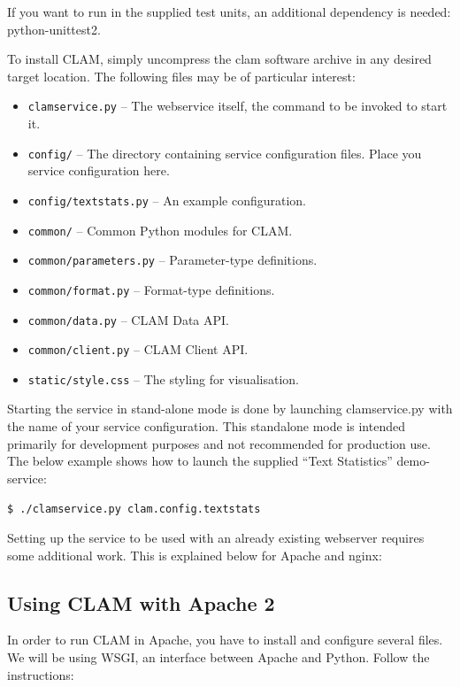 \documentclass[a4paper,12pt]{report}
\begin{document}
If you want to run in the supplied test units, an additional dependency is needed: python-unittest2.

To install CLAM, simply uncompress the clam software archive in any desired target location. The following files may be of particular interest:

\begin{itemize}
\item \texttt{clamservice.py} -- The webservice itself, the command to be invoked to start it.
\item \texttt{config/} -- The directory containing service configuration files. Place you service configuration here.
\item \texttt{config/textstats.py} -- An example configuration.
\item \texttt{common/} -- Common Python modules for CLAM.
\item \texttt{common/parameters.py} -- Parameter-type definitions.
\item \texttt{common/format.py} -- Format-type definitions.
\item \texttt{common/data.py} -- CLAM Data API.
\item \texttt{common/client.py} -- CLAM Client API.
\item \texttt{static/style.css} -- The styling for visualisation.
\end{itemize}

Starting the service in stand-alone mode is done by launching clamservice.py with the name of your service configuration. This standalone mode is intended primarily for development purposes and not recommended for production use. The below example shows how to launch the supplied ``Text Statistics'' demo-service:

\texttt{\$ ./clamservice.py clam.config.textstats}

Setting up the service to be used with an already existing webserver requires some additional work. This is explained below for Apache and nginx:

\subsection{Using CLAM with Apache 2}

In order to run CLAM in Apache, you have to install and configure several files. We will be using WSGI, an interface between Apache and Python. Follow the instructions:
\end{document}
